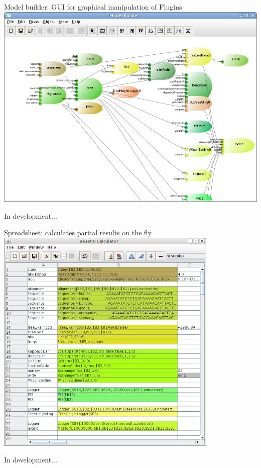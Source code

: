 \documentclass{beamer}
\theoremstyle{definition}
\begin{document}
\begin{frame}{Model builder: GUI for graphical manipulation of Plugins}
\includegraphics[width=\textwidth]{modelbuilder.png}

In development...
\end{frame}

\begin{frame}{Spreadsheet: calculates partial results on the fly}
\includegraphics[width=0.8\textwidth]{spreadsheet.png}

In development...
\end{frame}
\end{document}
